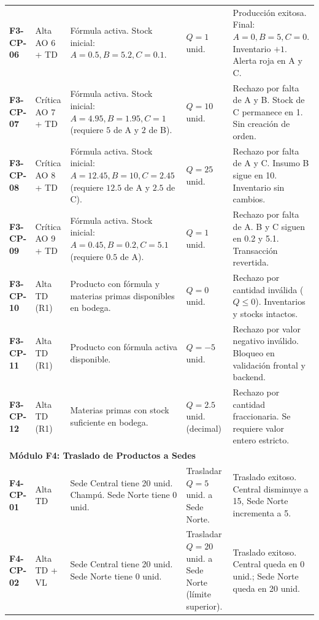 \documentclass[11pt,a4paper]{article}
\begin{document}
\begin{longtable}{p{1.4cm} p{1.6cm} p{4.2cm} p{3.2cm} p{4.6cm}}
\textbf{F3-CP-06} & Alta \newline AO 6 + TD & Fórmula activa. Stock inicial: $A{=}0.5, B{=}5.2, C{=}0.1$. & $Q=1$ unid. & Producción exitosa. Final: $A{=}0, B{=}5, C{=}0$. Inventario $+1$. Alerta roja en A y C. \\
\textbf{F3-CP-07} & Crítica \newline AO 7 + TD & Fórmula activa. Stock inicial: $A{=}4.95, B{=}1.95, C{=}1$ (requiere $5$ de A y $2$ de B). & $Q=10$ unid. & Rechazo por falta de A y B. Stock de C permanece en 1. Sin creación de orden. \\
\textbf{F3-CP-08} & Crítica \newline AO 8 + TD & Fórmula activa. Stock inicial: $A{=}12.45, B{=}10, C{=}2.45$ (requiere $12.5$ de A y $2.5$ de C). & $Q=25$ unid. & Rechazo por falta de A y C. Insumo B sigue en 10. Inventario sin cambios. \\
\textbf{F3-CP-09} & Crítica \newline AO 9 + TD & Fórmula activa. Stock inicial: $A{=}0.45, B{=}0.2, C{=}5.1$ (requiere $0.5$ de A). & $Q=1$ unid. & Rechazo por falta de A. B y C siguen en 0.2 y 5.1. Transacción revertida. \\
\textbf{F3-CP-10} & Alta \newline TD (R1) & Producto con fórmula y materias primas disponibles en bodega. & $Q=0$ unid. & Rechazo por cantidad inválida ($Q \le 0$). Inventarios y stocks intactos. \\
\textbf{F3-CP-11} & Alta \newline TD (R1) & Producto con fórmula activa disponible. & $Q=-5$ unid. & Rechazo por valor negativo inválido. Bloqueo en validación frontal y backend. \\
\textbf{F3-CP-12} & Alta \newline TD (R1) & Materias primas con stock suficiente en bodega. & $Q=2.5$ unid. (decimal) & Rechazo por cantidad fraccionaria. Se requiere valor entero estricto. \\
\midrule
\multicolumn{5}{l}{\textbf{\color{primary}Módulo F4: Traslado de Productos a Sedes}} \\
\midrule
\textbf{F4-CP-01} & Alta \newline TD & Sede Central tiene 20 unid. Champú. Sede Norte tiene 0 unid. & Trasladar $Q=5$ unid. a Sede Norte. & Traslado exitoso. Central disminuye a 15, Sede Norte incrementa a 5. \\
\textbf{F4-CP-02} & Alta \newline TD + VL & Sede Central tiene 20 unid. Sede Norte tiene 0 unid. & Trasladar $Q=20$ unid. a Sede Norte (límite superior). & Traslado exitoso. Central queda en 0 unid.; Sede Norte queda en 20 unid. \\

\end{longtable}
\end{document}
